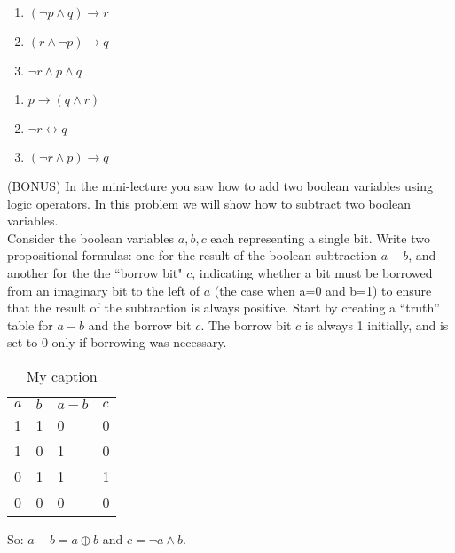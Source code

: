 \documentclass[solution, letterpaper]{cs20inclass}
\begin{document}
\begin{solution}

\subsolution

\begin{enumerate}
\item $(\neg p \land q) \to r$
\item $(r \land \neg p) \to q$
\item $\neg r \land p \land q$
\end{enumerate}

\subsolution

\begin{enumerate}
\item $p \to (q \land r)$
\item $\neg r \leftrightarrow q$
\item $(\neg r \land p) \to q$
\end{enumerate}

\end{solution}

\problem (BONUS) In the mini-lecture you saw how to add two boolean variables using logic operators. In this problem we will show how to subtract two boolean variables.\\
Consider the boolean variables $a, b, c$ each representing a single bit. Write two propositional formulas: one for the result of the boolean subtraction $a-b$, and another for the the ``borrow bit" $c$, indicating whether a bit must be borrowed from an imaginary bit to the left of $a$ (the case when a=0 and b=1) to ensure that the result of the subtraction is always positive. Start by creating a ``truth'' table for $a-b$ and the borrow bit $c$. The borrow bit $c$ is always 1 initially, and is set to 0 only if borrowing was necessary. 

\begin{solution}

\begin{table}[]
\centering
\caption{My caption}
\label{my-label}
\begin{tabular}{llll}
$a$ & $b$ & $a-b$ & $c$ \\
1 & 1 & 0   & 0 \\
1 & 0 & 1   & 0 \\
0 & 1 & 1   & 1 \\
0 & 0 & 0   & 0
\end{tabular}
\end{table}

So: $a-b = a \oplus b$ and $c = \neg a \land b$.
 
\end{solution}
\end{document}
